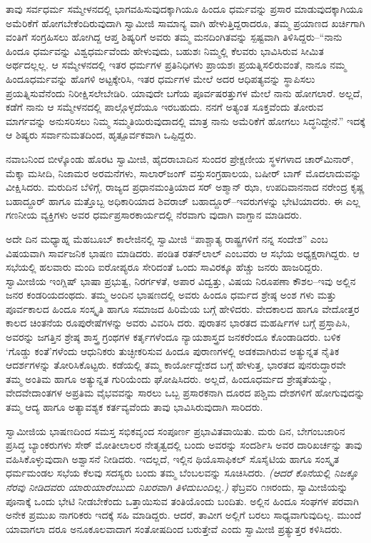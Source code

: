 ತಾವು ಸರ್ವಧರ್ಮ ಸಮ್ಮೇಳನದಲ್ಲಿ ಭಾಗವಹಿಸುವುದಕ್ಕಾಗಿಯೂ ಹಿಂದೂ ಧರ್ಮವನ್ನು ಪ್ರಸಾರ ಮಾಡುವುದಕ್ಕಾಗಿಯೂ ಅಮೆರಿಕೆಗೆ ಹೋಗಬೇಕೆಂದಿರುವುದಾಗಿ ಸ್ವಾಮೀಜಿ ಸಾಮಾನ್ಯ ವಾಗಿ ಹೇಳುತ್ತಿದ್ದರಾದರೂ, ತಮ್ಮ ಪ್ರಯಾಣದ ಖರ್ಚಿಗಾಗಿ ವಂತಿಗೆ ಸಂಗ್ರಹಿಸಲು ಹೋಗಿದ್ದ ಆಪ್ತ ಶಿಷ್ಯರಿಗೆ ಅವರು ತಮ್ಮ ಮನದಿಂಗಿತವನ್ನು ಸ್ಪಷ್ಟವಾಗಿ ತಿಳಿಸಿದ್ದರು–“ನಾನು ಹಿಂದೂ ಧರ್ಮವನ್ನು ವಿಶ್ವಧರ್ಮವೆಂದು ಹೇಳುವುದು, ಬಹುಶಃ ನಿಮ್ಮಲ್ಲಿ ಕೆಲವರು ಭಾವಿಸಿರುವ ಸೀಮಿತ ಅರ್ಥದಲ್ಲಲ್ಲ. ಆ ಸಮ್ಮೇಳನದಲ್ಲಿ ಇತರ ಧರ್ಮಗಳ ಪ್ರತಿನಿಧಿಗಳು ಪ್ರಾಯಶಃ ಪ್ರಯತ್ನಿಸಲಿರುವಂತೆ, ನಾನೂ ನಮ್ಮ ಹಿಂದೂಧರ್ಮವನ್ನು ಹೊಗಳಿ ಅಟ್ಟಕ್ಕೇರಿಸಿ, ಇತರ ಧರ್ಮಗಳ ಮೇಲೆ ಅದರ ಆಧಿಪತ್ಯವನ್ನು ಸ್ಥಾಪಿಸಲು ಪ್ರಯತ್ನಿಸುವೆನೆಂದು ನಿರೀಕ್ಷಿಸಲೇಬೇಡಿರಿ. ಯಾವುದೇ ಬಗೆಯ ಪೂರ್ವಷರತ್ತುಗಳ ಮೇಲೆ ನಾನು ಹೋಗಲಾರೆ. ಅಲ್ಲದೆ, ಕಡೆಗೆ ನಾನು ಆ ಸಮ್ಮೇಳನದಲ್ಲಿ ಪಾಲ್ಗೊಳ್ಳದೆಯೂ ಇರಬಹುದು. ನನಗೆ ಅತ್ಯಂತ ಸೂಕ್ತವೆಂದು ತೋರುವ ಮಾರ್ಗವನ್ನು ಅನುಸರಿಸಲು ನಿಮ್ಮ ಸಮ್ಮತಿಯಿರುವುದಾದಲ್ಲಿ ಮಾತ್ರ ನಾನು ಅಮೆರಿಕೆಗೆ ಹೋಗಲು ಸಿದ್ಧನಿದ್ದೇನೆ.” ಇದಕ್ಕೆ ಆ ಶಿಷ್ಯರು ಸರ್ವಾನುಮತದಿಂದ, ಹೃತ್ಪೂರ್ವಕವಾಗಿ ಒಪ್ಪಿದ್ದರು.

ನವಾಬನಿಂದ ಬೀಳ್ಕೊಂಡು ಹೊರಟ ಸ್ವಾಮೀಜಿ, ಹೈದರಾಬಾದಿನ ಸುಂದರ ಪ್ರೇಕ್ಷಣೀಯ ಸ್ಥಳಗಳಾದ ಚಾರ್​ಮಿನಾರ್, ಮೆಕ್ಕಾ ಮಸೀದಿ, ನಿಜಾಮರ ಅರಮನೆಗಳು, ಸಾಲಾರ್​ಜಂಗ್ ವಸ್ತುಸಂಗ್ರಹಾಲಯ, ಬಷೀರ್ ಬಾಗ್ ಮೊದಲಾದುವನ್ನು ವೀಕ್ಷಿಸಿದರು. ಮರುದಿನ ಬೆಳಿಗ್ಗೆ, ರಾಜ್ಯದ ಪ್ರಧಾನಮಂತ್ರಿಯಾದ ಸರ್ ಅಶ್ಮಾನ್ ಝಾ, ಉಪದಿವಾನನಾದ ನರೇಂದ್ರ ಕೃಷ್ಣ ಬಹಾದ್ದೂರ್ ಹಾಗೂ ಮತ್ತೊಬ್ಬ ಅಧಿಕಾರಿಯಾದ ಶಿವರಾಜ್ ಬಹಾದ್ದೂರ್​–ಇವರುಗಳನ್ನು ಭೇಟಿಯಾದರು. ಈ ಎಲ್ಲ ಗಣನೀಯ ವ್ಯಕ್ತಿಗಳು ಅವರ ಧರ್ಮಪ್ರಸಾರಕಾರ್ಯದಲ್ಲಿ ನೆರವಾಗು ವುದಾಗಿ ವಾಗ್ದಾನ ಮಾಡಿದರು.

ಅದೇ ದಿನ ಮಧ್ಯಾಹ್ನ ಮೆಹಬೂಬ್ ಕಾಲೇಜಿನಲ್ಲಿ ಸ್ವಾಮೀಜಿ “ಪಾಶ್ಚಾತ್ಯ ರಾಷ್ಟ್ರಗಳಿಗೆ ನನ್ನ ಸಂದೇಶ” ಎಂಬ ವಿಷಯವಾಗಿ ಸಾರ್ವಜನಿಕ ಭಾಷಣ ಮಾಡಿದರು. ಪಂಡಿತ ರತನ್​ಲಾಲ್ ಎಂಬವರು ಆ ಸಭೆಯ ಅಧ್ಯಕ್ಷರಾಗಿದ್ದರು. ಆ ಸಭೆಯಲ್ಲಿ ಹಲವಾರು ಮಂದಿ ಐರೋಪ್ಯರೂ ಸೇರಿದಂತೆ ಒಂದು ಸಾವಿರಕ್ಕೂ ಹೆಚ್ಚು ಜನರು ಹಾಜರಿದ್ದರು. ಸ್ವಾಮೀಜಿಯ ಇಂಗ್ಲಿಷ್ ಭಾಷಾ ಪ್ರಭುತ್ವ, ನಿರರ್ಗಳತೆ, ಅಪಾರ ವಿದ್ವತ್ತು, ವಿಷಯ ನಿರೂಪಣಾ ಕೌಶಲ–ಇವು ಅಲ್ಲಿನ ಜನರ ಕಂಡರಿಯದಂಥದು. ತಮ್ಮ ಅಂದಿನ ಭಾಷಣದಲ್ಲಿ ಅವರು ಹಿಂದೂ ಧರ್ಮದ ಶ್ರೇಷ್ಠ ಅಂಶ ಗಳು ಮತ್ತು ಪೂರ್ವಕಾಲದ ಹಿಂದೂ ಸಂಸ್ಕೃತಿ ಹಾಗೂ ಸಮಾಜದ ಹಿರಿಮೆಯ ಬಗ್ಗೆ ಹೇಳಿದರು. ವೇದಕಾಲದ ಹಾಗೂ ವೇದೋತ್ತರ ಕಾಲದ ಚಿಂತನೆಯ ರೂಪುರೇಷೆಗಳನ್ನು ಅವರು ವಿವರಿಸಿ ದರು. ಪುರಾತನ ಭಾರತದ ಮಹರ್ಷಿಗಳ ಬಗ್ಗೆ ಪ್ರಸ್ತಾಪಿಸಿ, ಅವರನ್ನು ಜಗತ್ತಿನ ಶ್ರೇಷ್ಠ ಶಾಸ್ತ್ರ ಗ್ರಂಥಗಳ ಕರ್ತೃಗಳೆಂದೂ ನ್ಯಾಯಶಾಸ್ತ್ರದ ಜನಕರೆಂದೂ ಕೊಂಡಾಡಿದರು. ಬಳಿಕ ‘ಗೊಡ್ಡು ಕಂತೆ’ಗಳೆಂದು ಆಧುನಿಕರು ತುಚ್ಛೀಕರಿಸುವ ಹಿಂದೂ ಪುರಾಣಗಳಲ್ಲಿ ಅಡಕವಾಗಿರುವ ಅತ್ಯುನ್ನತ ನೈತಿಕ ಆದರ್ಶಗಳನ್ನು ತೋರಿಸಿಕೊಟ್ಟರು. ಕಡೆಯಲ್ಲಿ ತಮ್ಮ ಕಾರ್ಯೋದ್ದೇಶದ ಬಗ್ಗೆ ಹೇಳುತ್ತ, ಭಾರತದ ಪುನರುದ್ಧಾರವೇ ತಮ್ಮ ಅಂತಿಮ ಹಾಗೂ ಅತ್ಯುನ್ನತ ಗುರಿಯೆಂದು ಘೋಷಿಸಿದರು. ಅಲ್ಲದೆ, ಹಿಂದೂಧರ್ಮದ ಶ್ರೇಷ್ಠತೆಯನ್ನು, ವೇದವೇದಾಂತಗಳ ಅಪ್ರತಿಮ ವೈಭವವನ್ನು ಸಾರಲು ಒಬ್ಬ ಪ್ರಸಾರಕನಾಗಿ ದೂರದ ಪಶ್ಚಿಮ ದೇಶಗಳಿಗೆ ಹೋಗುವುದನ್ನು ತಮ್ಮ ಆದ್ಯ ಹಾಗೂ ಅತ್ಯಾವಶ್ಯಕ ಕರ್ತವ್ಯವೆಂದು ತಾವು ಭಾವಿಸಿರುವುದಾಗಿ ಸಾರಿದರು.

ಸ್ವಾಮೀಜಿಯ ಭಾಷಣದಿಂದ ಸಮಸ್ತ ಸಭಿಕವೃಂದ ಸಂಪೂರ್ಣ ಪ್ರಭಾವಿತವಾಯಿತು. ಮರು ದಿನ, ಬೇಗಂಬಜಾರಿನ ಪ್ರಸಿದ್ಧ ಬ್ಯಾಂಕರುಗಳು ಸೇಠ್ ಮೋತೀಲಾಲರ ನೇತೃತ್ವದಲ್ಲಿ ಬಂದು ಅವರನ್ನು ಸಂದರ್ಶಿಸಿ ಅವರ ದಾರಿಖರ್ಚನ್ನು ತಾವು ವಹಿಸಿಕೊಳ್ಳುವುದಾಗಿ ಅಶ್ವಾಸನೆ ನೀಡಿದರು. ಇದಲ್ಲದೆ, ಇಲ್ಲಿನ ಥಿಯೊಸಾಫಿಕಲ್ ಸೊಸೈಟಿಯ ಹಾಗೂ ಸಂಸ್ಕೃತ ಧರ್ಮಮಂಡಲ ಸಭೆಯ ಕೆಲವು ಸದಸ್ಯರು ಬಂದು ತಮ್ಮ ಬೆಂಬಲವನ್ನು ಸೂಚಿಸಿದರು. \textit{(ಆದರೆ ಕೊನೆಯಲ್ಲಿ ನಿಜಕ್ಕೂ ನೆರವು ನೀಡಿದವರು ಯಾರುಯಾರೆಂಬುದು ನಿಖರವಾಗಿ ತಿಳಿದುಬಂದಿಲ್ಲ.)} ಫೆಬ್ರವರಿ ೧೫ರಂದು, ಸ್ವಾಮೀಜಿಯನ್ನು ಪೂನಾಕ್ಕೆ ಒಂದು ಭೇಟಿ ನೀಡಬೇಕೆಂದು ಒತ್ತಾಯಿಸುವ ತಂತಿಯೊಂದು ಬಂದಿತು. ಅಲ್ಲಿನ ಹಿಂದೂ ಸಂಘಗಳ ಪರವಾಗಿ ಅನೇಕ ಪ್ರಮುಖ ನಾಗರಿಕರು ಇದಕ್ಕೆ ಸಹಿ ಮಾಡಿದ್ದರು. ಆದರೆ, ತಾವೀಗ ಅಲ್ಲಿಗೆ ಬರಲು ಸಾಧ್ಯವಾಗುವುದಿಲ್ಲ. ಮುಂದೆ ಯಾವಾಗಲಾ ದರೂ ಅನೂಕೂಲವಾದಾಗ ಸಂತೋಷದಿಂದ ಬರುತ್ತೇವೆ ಎಂದು ಸ್ವಾಮೀಜಿ ಪ್ರತ್ಯುತ್ತರ ಕಳಿಸಿದರು.

